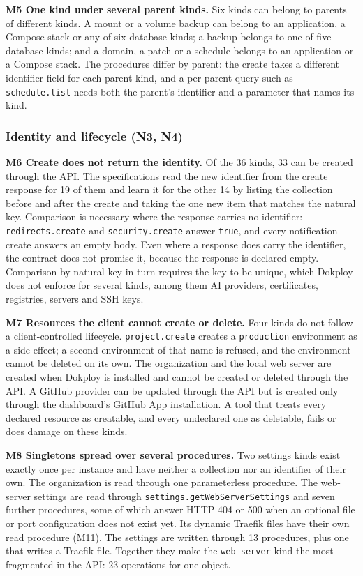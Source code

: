 \textbf{M5 One kind under several parent kinds.} Six kinds can belong to parents of different kinds. A
mount or a volume backup can belong to an application, a Compose stack or any of six database kinds;
a backup belongs to one of five database kinds; and a domain, a patch or a schedule belongs to an
application or a Compose stack. The procedures differ by parent: the create takes a different
identifier field for each parent kind, and a per-parent query such as \texttt{schedule.list} needs both the
parent's identifier and a parameter that names its kind.

\subsubsection*{Identity and lifecycle (N3, N4)}

\textbf{M6 Create does not return the identity.} Of the 36 kinds, 33 can be created through the API. The
specifications read the new identifier from the create response for 19 of them and learn it for the
other 14 by listing the collection before and after the create and taking the one new item that matches
the natural key. Comparison is necessary where the response carries no identifier:
\texttt{redirects.create} and \texttt{security.create} answer \texttt{true}, and every notification create answers an empty
body. Even where a response does carry the identifier, the contract does not promise it, because the
response is declared empty. Comparison by natural key in turn requires the key to be unique, which
Dokploy does not enforce for several kinds, among them AI providers, certificates, registries,
servers and SSH keys.

\textbf{M7 Resources the client cannot create or delete.} Four kinds do not follow a client-controlled
lifecycle. \texttt{project.create} creates a \texttt{production} environment as a side effect; a second environment
of that name is refused, and the environment cannot be deleted on its own. The organization and the
local web server are created when Dokploy is installed and cannot be created or deleted through the
API. A GitHub provider can be updated through the API but is created only through the dashboard's
GitHub App installation. A tool that treats every declared resource as creatable, and every undeclared
one as deletable, fails or does damage on these kinds.

\textbf{M8 Singletons spread over several procedures.} Two settings kinds exist exactly once per instance
and have neither a collection nor an identifier of their own. The organization is read through one
parameterless procedure. The web-server settings are read through \texttt{settings.getWebServerSettings} and
seven further procedures, some of which answer HTTP 404 or 500 when an optional file or port
configuration does not exist yet. Its dynamic Traefik files have their own read procedure (M11). The
settings are written through 13 procedures, plus one that writes a Traefik file. Together they make the
\texttt{web\_server} kind the most fragmented in the API: 23 operations for one object.

